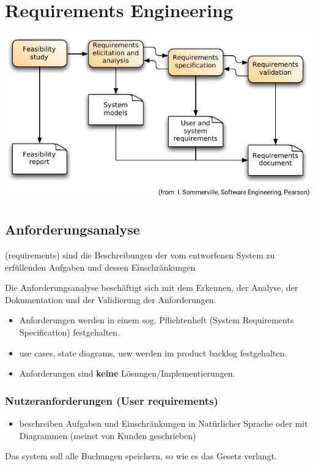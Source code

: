 \documentclass[ngerman,color=3b]{tuda_summary}
\begin{document}
\section{Requirements Engineering}
\includegraphics{bilder/Requirements engineering Process Flow.pdf}
{\centering
    \subsection{Anforderungsanalyse}
}
\begin{definition}[Anforderungen]
    (requirements) sind die Beschreibungen der vom entworfenen System zu erfüllenden Aufgaben und dessen Einschränkungen
\end{definition}
Die Anforderungsanalyse beschäftigt sich mit dem Erkennen, der Analyse, der Dokumentation und der Validierung der Anforderungen.
\begin{itemize}
    \item Anforderungen werden in einem sog. Pflichtenheft (System Requirements Specification) festgehalten.
    \item use cases, state diagrams, usw werden im product backlog festgehalten.
    \item Anforderungen sind \textbf{keine} Lösungen/Implementierungen.
\end{itemize}
\subsubsection{Nutzeranforderungen (User requirements)}
\begin{itemize}
    \item beschreiben Aufgaben und Einschränkungen in Natürlicher Sprache oder mit Diagrammen (meinst von Kunden geschrieben)
\end{itemize}
 Das system soll alle Buchungen speichern, so wie es das Gesetz verlangt.
\end{document}
